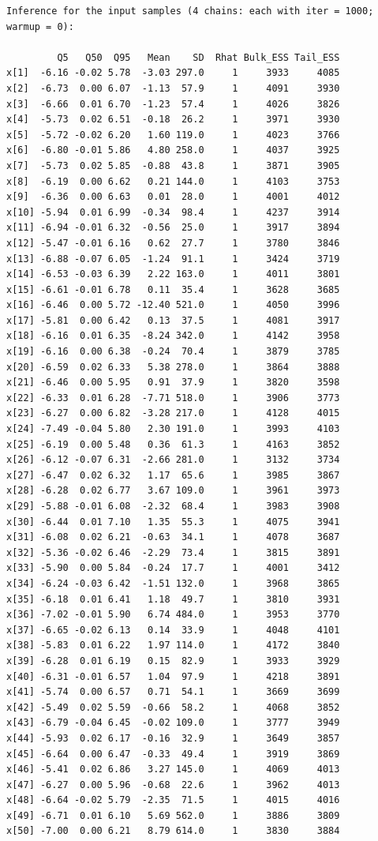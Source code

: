 \documentclass[american,]{article}
\begin{document}
\begin{verbatim}
Inference for the input samples (4 chains: each with iter = 1000; warmup = 0):

         Q5   Q50  Q95   Mean    SD  Rhat Bulk_ESS Tail_ESS
x[1]  -6.16 -0.02 5.78  -3.03 297.0     1     3933     4085
x[2]  -6.73  0.00 6.07  -1.13  57.9     1     4091     3930
x[3]  -6.66  0.01 6.70  -1.23  57.4     1     4026     3826
x[4]  -5.73  0.02 6.51  -0.18  26.2     1     3971     3930
x[5]  -5.72 -0.02 6.20   1.60 119.0     1     4023     3766
x[6]  -6.80 -0.01 5.86   4.80 258.0     1     4037     3925
x[7]  -5.73  0.02 5.85  -0.88  43.8     1     3871     3905
x[8]  -6.19  0.00 6.62   0.21 144.0     1     4103     3753
x[9]  -6.36  0.00 6.63   0.01  28.0     1     4001     4012
x[10] -5.94  0.01 6.99  -0.34  98.4     1     4237     3914
x[11] -6.94 -0.01 6.32  -0.56  25.0     1     3917     3894
x[12] -5.47 -0.01 6.16   0.62  27.7     1     3780     3846
x[13] -6.88 -0.07 6.05  -1.24  91.1     1     3424     3719
x[14] -6.53 -0.03 6.39   2.22 163.0     1     4011     3801
x[15] -6.61 -0.01 6.78   0.11  35.4     1     3628     3685
x[16] -6.46  0.00 5.72 -12.40 521.0     1     4050     3996
x[17] -5.81  0.00 6.42   0.13  37.5     1     4081     3917
x[18] -6.16  0.01 6.35  -8.24 342.0     1     4142     3958
x[19] -6.16  0.00 6.38  -0.24  70.4     1     3879     3785
x[20] -6.59  0.02 6.33   5.38 278.0     1     3864     3888
x[21] -6.46  0.00 5.95   0.91  37.9     1     3820     3598
x[22] -6.33  0.01 6.28  -7.71 518.0     1     3906     3773
x[23] -6.27  0.00 6.82  -3.28 217.0     1     4128     4015
x[24] -7.49 -0.04 5.80   2.30 191.0     1     3993     4103
x[25] -6.19  0.00 5.48   0.36  61.3     1     4163     3852
x[26] -6.12 -0.07 6.31  -2.66 281.0     1     3132     3734
x[27] -6.47  0.02 6.32   1.17  65.6     1     3985     3867
x[28] -6.28  0.02 6.77   3.67 109.0     1     3961     3973
x[29] -5.88 -0.01 6.08  -2.32  68.4     1     3983     3908
x[30] -6.44  0.01 7.10   1.35  55.3     1     4075     3941
x[31] -6.08  0.02 6.21  -0.63  34.1     1     4078     3687
x[32] -5.36 -0.02 6.46  -2.29  73.4     1     3815     3891
x[33] -5.90  0.00 5.84  -0.24  17.7     1     4001     3412
x[34] -6.24 -0.03 6.42  -1.51 132.0     1     3968     3865
x[35] -6.18  0.01 6.41   1.18  49.7     1     3810     3931
x[36] -7.02 -0.01 5.90   6.74 484.0     1     3953     3770
x[37] -6.65 -0.02 6.13   0.14  33.9     1     4048     4101
x[38] -5.83  0.01 6.22   1.97 114.0     1     4172     3840
x[39] -6.28  0.01 6.19   0.15  82.9     1     3933     3929
x[40] -6.31 -0.01 6.57   1.04  97.9     1     4218     3891
x[41] -5.74  0.00 6.57   0.71  54.1     1     3669     3699
x[42] -5.49  0.02 5.59  -0.66  58.2     1     4068     3852
x[43] -6.79 -0.04 6.45  -0.02 109.0     1     3777     3949
x[44] -5.93  0.02 6.17  -0.16  32.9     1     3649     3857
x[45] -6.64  0.00 6.47  -0.33  49.4     1     3919     3869
x[46] -5.41  0.02 6.86   3.27 145.0     1     4069     4013
x[47] -6.27  0.00 5.96  -0.68  22.6     1     3962     4013
x[48] -6.64 -0.02 5.79  -2.35  71.5     1     4015     4016
x[49] -6.71  0.01 6.10   5.69 562.0     1     3886     3809
x[50] -7.00  0.00 6.21   8.79 614.0     1     3830     3884


\end{verbatim}
\end{document}
